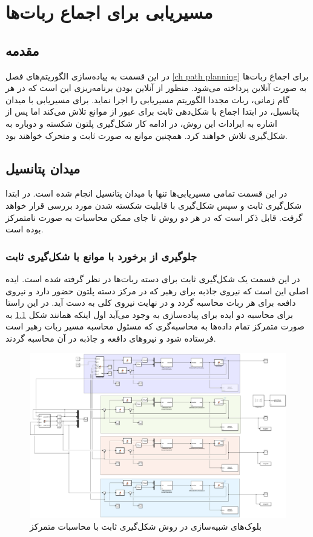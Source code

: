 \chapter{مسیریابی برای اجماع ربات‌ها}
\section{مقدمه}
در این قسمت به پیاده‌سازی الگوریتم‌های فصل \ref{ch path planning} برای اجماع ربات‌ها به صورت آنلاین پرداخته می‌شود. منظور از آنلاین بودن برنامه‌ریزی این است که در هر گام زمانی، ربات مجددا الگوریتم مسیریابی را اجرا نماید. برای مسیریابی با میدان پتانسیل، در ابتدا اجماع با شکل‌دهی ثابت برای عبور از موانع تلاش می‌کند اما پس از اشاره به ایرادات این روش، در ادامه کار شکل‌گیری پلتون شکسته و دوباره به شکل‌گیری تلاش خواهند کرد. همچنین موانع به صورت ثابت و متحرک خواهند بود.

\section{میدان پتانسیل}
در این قسمت تمامی مسیریابی‌ها تنها با میدان پتانسیل انجام شده است. در ابتدا شکل‌گیری ثابت و سپس شکل‌گیری با قابلیت شکسته شدن مورد بررسی قرار خواهد گرفت. قابل ذکر است که در هر دو روش تا جای ممکن محاسبات به صورت نامتمرکز بوده است.

\subsection{جلوگیری از برخورد با موانع با شکل‌گیری ثابت}
در این قسمت یک شکل‌گیری ثابت برای دسته ربات‌ها در نظر گرفته شده است. ایده اصلی این است که نیروی جاذبه برای رهبر که در مرکز دسته پلتون حضور دارد و نیروی دافعه برای هر ربات محاسبه گردد و در نهایت نیروی کلی به دست آید. در این راستا برای محاسبه دو ایده برای پیاده‌سازی به وجود می‌آید اول اینکه همانند شکل \ref{Fig platoon-potential-field-simulink} به صورت متمرکز تمام داده‌ها به محاسبه‌گری که مسئول محاسبه مسیر ربات رهبر است فرستاده شود و نیروهای دافعه و جاذبه در آن محاسبه گردند.
\begin{figure}[!h]
	\centering
	\includegraphics[scale=0.25]{Images/platoon-potential-field-simulink.png}
	\caption{بلوک‌های شبیه‌سازی در روش شکل‌گیری ثابت با محاسبات متمرکز}\label{Fig platoon-potential-field-simulink}
\end{figure}



